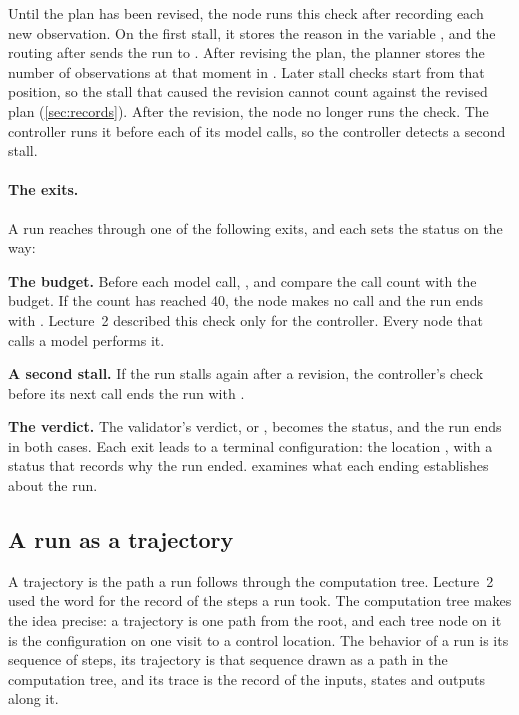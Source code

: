 Until the plan has been revised, the  node runs this check after recording each new
observation. On the first stall, it stores the reason in the variable , and the
routing after  sends the run to . After revising the plan, the planner
stores the number of observations at that moment in . Later stall checks
start from that position, so the stall that caused the revision cannot count against the revised
plan (\cref{sec:records}). After the revision, the  node no longer runs the check.
The controller runs it before each of its model calls, so the controller detects a second stall.

\paragraph{The exits.}
A run reaches  through one of the following exits, and each sets the status on the way:
\bi
\item \textbf{The budget.} Before each model call, ,  and
 compare the call count with the budget. If the count has reached 40, the node
makes no call and the run ends with . Lecture~2 described this check only
for the controller. Every node that calls a model performs it.
\item \textbf{A second stall.} If the run stalls again after a revision, the controller's check
before its next call ends the run with .
\item \textbf{The verdict.} The validator's verdict,  or ,
becomes the status, and the run ends in both cases.
\ei
Each exit leads to a terminal configuration: the location , with a status that records
why the run ended.  examines what each ending establishes about the run.

\subsection{A run as a trajectory}
\label{sec:machines-trajectory}

A trajectory is the path a run follows through the computation tree. Lecture~2 used the word for
the record of the steps a run took. The computation tree makes the idea precise: a trajectory is one
path from the root, and each tree node on it is the configuration on one visit to a control
location. The behavior of a run is its sequence of steps, its trajectory is that sequence drawn as a
path in the computation tree, and its trace is the record of the inputs, states and outputs along
it.

